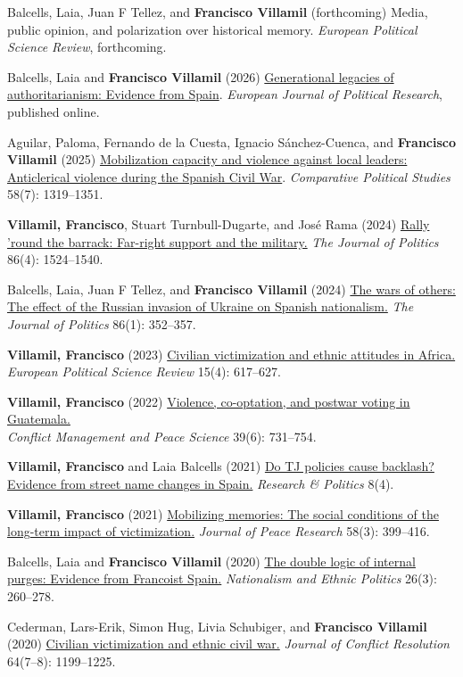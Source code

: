 \documentclass[a4paper, 12pt]{article}
\begin{document}
\begin{etaremune}[leftmargin=12pt, itemsep=0pt]
\item Balcells, Laia, Juan F Tellez, and \textbf{Francisco Villamil} (forthcoming) Media, public opinion, and polarization over historical memory. \textit{European Political Science Review}, forthcoming.
\item Balcells, Laia and \textbf{Francisco Villamil} (2026) \href{https://doi.org/10.1017/S1475676526101042}{Generational legacies of authoritarianism: Evidence from Spain}. \textit{European Journal of Political Research}, published online.
\item Aguilar, Paloma, Fernando de la Cuesta, Ignacio Sánchez-Cuenca, and \textbf{Francisco Villamil} (2025) \href{https://doi.org/10.1177/00104140241269894}{Mobilization capacity and violence against local leaders: Anticlerical violence during the Spanish Civil War}. \textit{Comparative Political Studies} 58(7): 1319--1351.
\item \textbf{Villamil, Francisco}, Stuart Turnbull-Dugarte, and José Rama (2024) \href{https://doi.org/10.1086/727598}{Rally 'round the barrack: Far-right support and the military.} \textit{The Journal of Politics} 86(4): 1524--1540.
\item Balcells, Laia, Juan F Tellez, and \textbf{Francisco Villamil} (2024) \href{https://doi.org/10.1086/726939}{The wars of others: The effect of the Russian invasion of Ukraine on Spanish nationalism.} \textit{The Journal of Politics} 86(1): 352--357.
\item \textbf{Villamil, Francisco} (2023) \href{https://doi.org/10.1017/S1755773923000097}{Civilian victimization and ethnic attitudes in Africa.}\\\textit{European Political Science Review} 15(4): 617--627.
\item \textbf{Villamil, Francisco} (2022) \href{https://journals.sagepub.com/doi/full/10.1177/07388942211066539}{Violence, co-optation, and postwar voting in Guatemala.}\\\textit{Conflict Management and Peace Science} 39(6): 731--754.
\item \textbf{Villamil, Francisco} and Laia Balcells (2021) \href{https://journals.sagepub.com/doi/full/10.1177/20531680211058550}{Do TJ policies cause backlash? Evidence from street name changes in Spain.} \textit{Research \& Politics} 8(4).
\item \textbf{Villamil, Francisco} (2021) \href{https://doi.org/10.1177/0022343320912816}{Mobilizing memories: The social conditions of the long-term impact of victimization.} \textit{Journal of Peace Research} 58(3): 399--416.
\item Balcells, Laia and \textbf{Francisco Villamil} (2020) \href{https://doi.org/10.1080/13537113.2020.1795451}{The double logic of internal purges: Evidence from Francoist Spain.} \textit{Nationalism and Ethnic Politics} 26(3): 260--278.
\item Cederman, Lars-Erik, Simon Hug, Livia Schubiger, and \textbf{Francisco Villamil} (2020) \href{https://doi.org/10.1177/0022002719898873}{Civilian victimization and ethnic civil war.} \textit{Journal of Conflict Resolution} 64(7--8): 1199--1225.
\end{etaremune}
\end{document}
